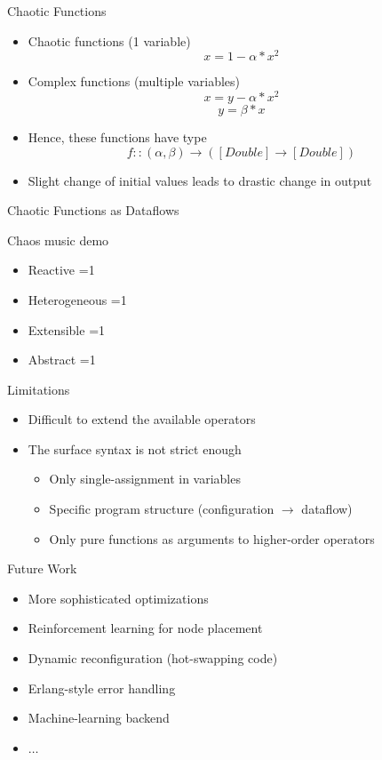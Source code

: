 \documentclass{beamer}
\newcommand{\done}{\ding{51}}
\newcommand{\checklist}[4]{
  \begin{frame}[standout]
	  \begin{itemize}
    \item Reactive \ifnum #1=1 \done \fi
    \item Heterogeneous \ifnum #2=1 \done \fi
    \item Extensible \ifnum #3=1 \done \fi
    \item Abstract \ifnum #4=1 \done \fi
    \end{itemize}
  \end{frame}
}
\begin{document}
  \begin{frame}{Chaotic Functions}
    \begin{itemize}
    \item Chaotic functions (1 variable)
      \[ x = 1 - \alpha * x^2 \]
    \item Complex functions (multiple variables)
      \[ x = y - \alpha * x^2 \]
      \[ y = \beta * x \]
    \item Hence, these functions have type
      \[ f :: (\alpha, \beta) \rightarrow ([Double] \rightarrow [Double]) \]
    \item Slight change of initial values leads to drastic change in output
    \end{itemize}
  \end{frame}
  
  \begin{frame}{Chaotic Functions as Dataflows}
    \begin{minipage}{.5\textwidth}\centering
		\end{minipage}
		\hfill
		\begin{minipage}{.45\textwidth}\centering
		  
	  \end{minipage}
  \end{frame}
  
  \begin{frame}[standout]
	  Chaos music demo
	\end{frame}
  
  \checklist{1}{1}{1}{1}
  
  \begin{frame}{Limitations}
    \begin{itemize}
    \item Difficult to extend the available operators
    \item The surface syntax is not strict enough
      \begin{itemize}
      \item Only single-assignment in  variables
      \item Specific program structure (configuration $\rightarrow$ dataflow)
      \item Only pure functions as arguments to higher-order operators
      \end{itemize}
    \end{itemize}
  \end{frame}
  
  \begin{frame}{Future Work}
    \begin{itemize}
    \item More sophisticated optimizations
    \item Reinforcement learning for node placement
    \item Dynamic reconfiguration (hot-swapping code)
    \item Erlang-style error handling
    \item Machine-learning backend
    \item $\dots$
    \end{itemize}
  \end{frame}
  
\end{document}
